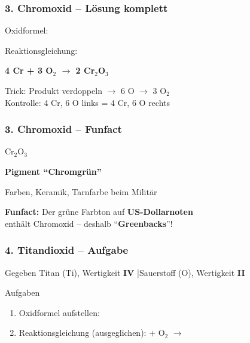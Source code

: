 \documentclass[aspectratio=169, 12pt]{beamer}
\newcommand{\lsg}[1]{\textcolor{loesung}{\textbf{#1}}}
\newcommand{\luecke}{\underline{\hspace{2.5cm}}}
\begin{document}
\begin{frame}
\frametitle{3. Chromoxid – Lösung komplett}
\begin{center}
\vspace{0.3cm}
{\large Oxidformel:} \quad {\Huge \lsg{Cr$_2$O$_3$}}
\vspace{0.8cm}

{\large Reaktionsgleichung:}
\vspace{0.4cm}

{\Huge \lsg{4 Cr + 3 O$_2$ $\rightarrow$ 2 Cr$_2$O$_3$}}
\vspace{0.4cm}

{\small Trick: Produkt verdoppeln $\rightarrow$ 6 O $\rightarrow$ 3 O$_2$}\\
{\small Kontrolle: 4 Cr, 6 O links = 4 Cr, 6 O rechts \checkmark}
\end{center}
\end{frame}

\begin{frame}
\frametitle{3. Chromoxid – Funfact}
\begin{center}
\vspace{0.3cm}
{\Huge \textcolor{chemie}{Cr$_2$O$_3$}}
\vspace{0.8cm}

{\Large\textbf{Pigment ``Chromgrün''}}
\vspace{0.5cm}

Farben, Keramik, Tarnfarbe beim Militär
\vspace{0.8cm}

\textcolor{akzent}{\textbf{Funfact:}} Der grüne Farbton auf \textbf{US-Dollarnoten}\\
enthält Chromoxid – deshalb ``\textbf{Greenbacks}''!
\end{center}
\end{frame}


\begin{frame}
\frametitle{4. Titandioxid – Aufgabe}
\begin{block}{Gegeben}
Titan (Ti), Wertigkeit \textbf{IV} \quad|\quad Sauerstoff (O), Wertigkeit \textbf{II}
\end{block}
\vspace{0.5cm}
\begin{block}{Aufgaben}
\begin{enumerate}
\item Oxidformel aufstellen: \luecke
\item Reaktionsgleichung (ausgeglichen): \quad \luecke{} + O$_2$ $\rightarrow$ \luecke
\end{enumerate}
\end{block}
\end{frame}
\end{document}
